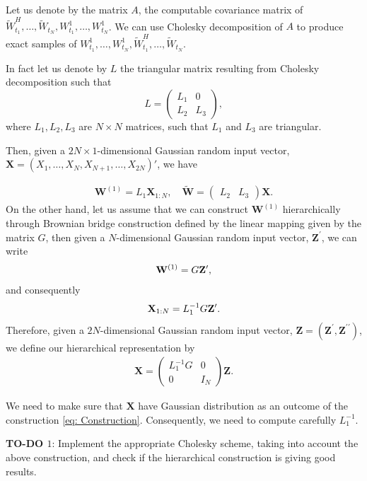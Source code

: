 Let us denote by the matrix $A$, the computable covariance matrix of  $ \widetilde{W}^H_{t_1},\dots, \widetilde{W}_{t_N},W^1_{t_1},\dots, W^1_{t_N}$.  We can use Cholesky decomposition of $A$ to produce exact samples of $W^1_{t_1},\dots, W^1_{t_N}, \widetilde{W}^H_{t_1},\dots, \widetilde{W}_{t_N}$.

In fact let us denote by $L$ the triangular matrix resulting from Cholesky decomposition such that 
\[
L=
\left(
\begin{array}{c|c}
L_1& 0 \\
L_2 & L_3
\end{array}
\right),
\]
where $L_1, L_2,L_3$ are $N \times N$ matrices, such that $L_1$ and $L_3$ are triangular.

Then, given  a $2 N \times 1$-dimensional Gaussian random input vector, $\mathbf{X}=(X_1, \dots,X_N, X_{N+1}, \dots, X_{2N})'$, we have

\begin{align}
\mathbf{W}^{(1)}=L_1 \mathbf{X}_{1:N}, \quad \widetilde{\mathbf{W}}= 
\left(
\begin{array}{c|c}
L_2 & L_3 
\end{array}
\right) \mathbf{X}.
\end{align}
On the other hand, let us assume that we can construct $\mathbf{W}^{(1)}$ hierarchically  through  Brownian bridge construction defined by the linear mapping given by the matrix $G$, then given a $ N$-dimensional Gaussian random input vector, $\mathbf{Z}^\prime$, we can write
\begin{align*}
\mathbf{W}^{(1)}=G  \mathbf{Z}^\prime ,
\end{align*}
and consequently
\begin{align*}
 \mathbf{X}_{1:N}= L_1^{-1} G  \mathbf{Z}^\prime .
\end{align*}
Therefore, given a $2 N$-dimensional Gaussian random input vector, $\mathbf{Z}=(\mathbf{Z}^\prime,\mathbf{Z}^{\prime \prime})$, we define our hierarchical representation by
\begin{align}\label{eq: Construction}
\mathbf{X}=\left(
\begin{array}{c|c}
L_1^{-1} G & 0\\
0 & I_{N} 
\end{array}
\right) \mathbf{Z}.
\end{align}

We need to make sure that $\mathbf{X}$  have Gaussian distribution as an outcome of the construction \eqref{eq: Construction}. Consequently, we need to compute carefully $L_1^{-1}$.



\textbf{TO-DO $1$}: Implement the appropriate Cholesky scheme, taking into account the above construction, and check if the hierarchical construction is giving good results.

